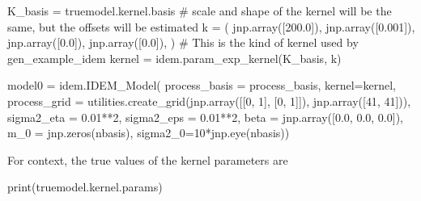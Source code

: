 \documentclass[
]{report}
\newenvironment{Shaded}{\begin{snugshade}}{\end{snugshade}}
\newcommand{\BuiltInTok}[1]{\textcolor[rgb]{0.00,0.23,0.31}{#1}}
\newcommand{\CommentTok}[1]{\textcolor[rgb]{0.37,0.37,0.37}{#1}}
\newcommand{\DecValTok}[1]{\textcolor[rgb]{0.68,0.00,0.00}{#1}}
\newcommand{\FloatTok}[1]{\textcolor[rgb]{0.68,0.00,0.00}{#1}}
\newcommand{\NormalTok}[1]{\textcolor[rgb]{0.00,0.23,0.31}{#1}}
\newcommand{\OperatorTok}[1]{\textcolor[rgb]{0.37,0.37,0.37}{#1}}
\begin{document}
\begin{Shaded}
\begin{Highlighting}[]
\NormalTok{K\_basis }\OperatorTok{=}\NormalTok{ truemodel.kernel.basis}
\CommentTok{\# scale and shape of the kernel will be the same, but the offsets will be estimated}
\NormalTok{k }\OperatorTok{=}\NormalTok{ (}
\NormalTok{    jnp.array([}\FloatTok{200.0}\NormalTok{]),}
\NormalTok{    jnp.array([}\FloatTok{0.001}\NormalTok{]),}
\NormalTok{    jnp.array([}\FloatTok{0.0}\NormalTok{]),}
\NormalTok{    jnp.array([}\FloatTok{0.0}\NormalTok{]),}
\NormalTok{)}
\CommentTok{\# This is the kind of kernel used by \textasciigrave{}\textasciigrave{}\textasciigrave{}gen\_example\_idem\textasciigrave{}\textasciigrave{}\textasciigrave{}}
\NormalTok{kernel }\OperatorTok{=}\NormalTok{ idem.param\_exp\_kernel(K\_basis, k)}

\NormalTok{model0 }\OperatorTok{=}\NormalTok{ idem.IDEM\_Model(}
\NormalTok{                    process\_basis }\OperatorTok{=}\NormalTok{ process\_basis,}
\NormalTok{                    kernel}\OperatorTok{=}\NormalTok{kernel,}
\NormalTok{                    process\_grid }\OperatorTok{=}\NormalTok{ utilities.create\_grid(jnp.array([[}\DecValTok{0}\NormalTok{, }\DecValTok{1}\NormalTok{], [}\DecValTok{0}\NormalTok{, }\DecValTok{1}\NormalTok{]]),}
\NormalTok{                                               jnp.array([}\DecValTok{41}\NormalTok{, }\DecValTok{41}\NormalTok{])),}
\NormalTok{                    sigma2\_eta }\OperatorTok{=} \FloatTok{0.01}\OperatorTok{**}\DecValTok{2}\NormalTok{,}
\NormalTok{                    sigma2\_eps }\OperatorTok{=} \FloatTok{0.01}\OperatorTok{**}\DecValTok{2}\NormalTok{,}
\NormalTok{                    beta }\OperatorTok{=}\NormalTok{ jnp.array([}\FloatTok{0.0}\NormalTok{, }\FloatTok{0.0}\NormalTok{, }\FloatTok{0.0}\NormalTok{]),}
\NormalTok{                    m\_0 }\OperatorTok{=}\NormalTok{ jnp.zeros(nbasis),}
\NormalTok{                    sigma2\_0}\OperatorTok{=}\DecValTok{10}\OperatorTok{*}\NormalTok{jnp.eye(nbasis))}
\end{Highlighting}
\end{Shaded}

For context, the true values of the kernel parameters are

\begin{Shaded}
\begin{Highlighting}[]
\BuiltInTok{print}\NormalTok{(truemodel.kernel.params)}
\end{Highlighting}
\end{Shaded}
\end{document}
